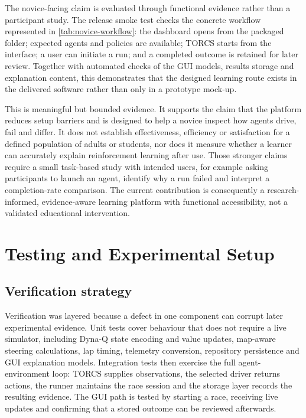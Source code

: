 The novice-facing claim is evaluated through functional evidence rather than a participant study. The release smoke test checks the concrete workflow represented in \cref{tab:novice-workflow}: the dashboard opens from the packaged folder; expected agents and policies are available; TORCS starts from the interface; a user can initiate a run; and a completed outcome is retained for later review. Together with automated checks of the GUI models, results storage and explanation content, this demonstrates that the designed learning route exists in the delivered software rather than only in a prototype mock-up.

This is meaningful but bounded evidence. It supports the claim that the platform reduces setup barriers and is designed to help a novice inspect how agents drive, fail and differ. It does not establish effectiveness, efficiency or satisfaction for a defined population of adults or students, nor does it measure whether a learner can accurately explain reinforcement learning after use. Those stronger claims require a small task-based study with intended users, for example asking participants to launch an agent, identify why a run failed and interpret a completion-rate comparison. The current contribution is consequently a research-informed, evidence-aware learning platform with functional accessibility, not a validated educational intervention.

\section{Testing and Experimental Setup}
\label{ch:testing}

\subsection{Verification strategy}

Verification was layered because a defect in one component can corrupt later experimental evidence. Unit tests cover behaviour that does not require a live simulator, including Dyna-Q state encoding and value updates, map-aware steering calculations, lap timing, telemetry conversion, repository persistence and GUI explanation models. Integration tests then exercise the full agent-environment loop: TORCS supplies observations, the selected driver returns actions, the runner maintains the race session and the storage layer records the resulting evidence. The GUI path is tested by starting a race, receiving live updates and confirming that a stored outcome can be reviewed afterwards.

